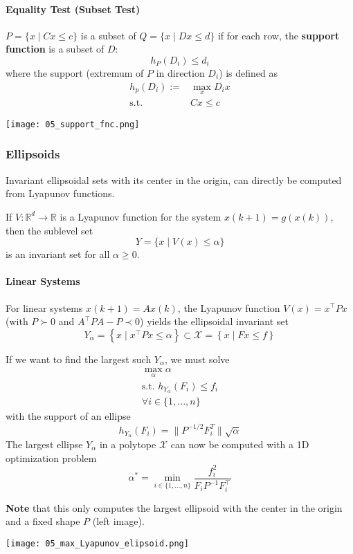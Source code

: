 \paragraph{Equality Test (Subset Test)}
$P=\{x\mid Cx\leq c\}$ is a subset of $Q=\{x\mid Dx\leq d\}$ if for each row, the \textbf{support function} is a subset of $D$:
\begin{equation*}
    h_P(D_i) \leq d_i
\end{equation*}
where the support (extremum of $P$ in direction $D_i$) is defined as
\begin{align*}
    h_p(D_i) :=     & \max_x D_i x \\
    \mathrm{s.t.}\; & Cx\leq c
\end{align*}
\begin{center}
    \texttt{[image: 05\_support\_fnc.png]}
\end{center}
\subsubsection{Ellipsoids}
Invariant ellipsoidal sets with its center in the origin, can directly be computed from Lyapunov functions.

\newpar{}
If $V:\mathbb{R}^d\to\mathbb{R}$ is a Lyapunov function for the system $x(k+1)=g(x(k))$, then the sublevel set
\begin{equation*}
    Y = \{x\mid V(x)\leq \alpha\}
\end{equation*}
is an invariant set for all $\alpha \geq 0$.

\paragraph{Linear Systems}
For linear systems $x(k+1)=Ax(k)$, the Lyapunov function $V(x)=x^\top Px$ (with $P\succ 0$  and $A^\top PA-P \prec 0$) yields the ellipsoidal invariant set
\begin{equation*}
    Y_\alpha = \left\{x\mid x^\top Px\leq \alpha\right\} \subset \mathcal{X}= \left\{x\mid Fx\leq f\right\}
\end{equation*}

\newpar{}

If we want to find the largest such $Y_\alpha$, we must solve
\begin{gather*}
    \max_{\alpha}\alpha \\
    \text{s.t. }h_{Y_{\alpha}}(F_{i})\leq f_{i} \\
    \forall i\in\{1,...,n\}
\end{gather*}
with the support of an ellipse
\begin{equation*}
    h_{Y_\alpha}(F_i)=\|P^{-1/2}F_i^T\|\sqrt{\alpha}
\end{equation*}
The largest ellipse $Y_\alpha$ in a polytope $\mathcal{X}$ can now be computed with a 1D optimization problem
\begin{equation*}
    \alpha^* = \min_{i\in \{1,\ldots, n\}} \frac{f_i^2}{F_i P^{-1} F_i^\top}
\end{equation*}

\textbf{Note} that this only computes the largest ellipsoid with the center in the origin and a fixed shape $P$ (left image).
\begin{center}
    \texttt{[image: 05\_max\_Lyapunov\_elipsoid.png]}
\end{center}

